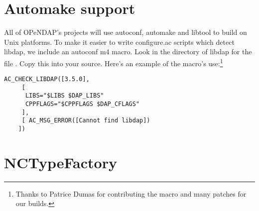 \documentclass[justify]{dods-paper}
\begin{document}
\section{Automake support}

All of OPeNDAP's projects will use autoconf, automake and libtool to
build on Unix platforms. To make it easier to write configure.ac
scripts which detect libdap, we include an autoconf m4 macro. Look in
the  directory of libdap for the file . Copy
this into your source. Here's an example of the macro's
use:\footnote{Thanks to Patrice Dumas for contributing the macro and
  many patches for our builds.}

\begin{lstlisting}[caption={libdap.m4}]
    AC_CHECK_LIBDAP([3.5.0],
     [
      LIBS="$LIBS $DAP_LIBS"
      CPPFLAGS="$CPPFLAGS $DAP_CFLAGS"
     ],
     [ AC_MSG_ERROR([Cannot find libdap])
    ])
\end{lstlisting}

\appendix

\section{NCTypeFactory}
\label{type-decl}
\end{document}
